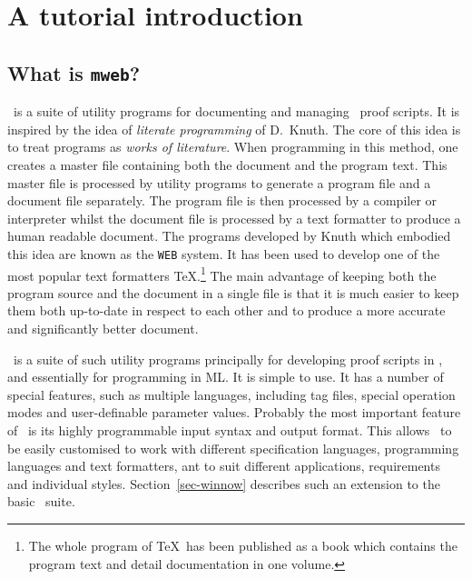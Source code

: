 \section{A tutorial introduction}

\subsection{What is {\tt mweb}?}

\mweb\ is a suite of utility programs for documenting and managing \HOL\ proof
scripts. It is inspired by the idea of {\em literate
programming\/} of D.~Knuth\cite{Knuth:CJ-27-2-97}. The core of this idea
is to treat programs as {\it works of literature\/}. When programming
in this method, one creates a master file containing both the document
and the program text. This master file is processed by utility
programs to generate a program file and a document file separately. The
program file is then processed by a compiler or interpreter whilst the
document file is processed by a text formatter to produce a human
readable document. The programs developed by Knuth which embodied this
idea are known as the {\tt WEB} system. It has been used to develop one
of the most popular text formatters \TeX.\footnote{The whole program of
\TeX\ has been published as a book \cite{Knuth:ct-b} which
contains the program text and detail documentation in one volume.} The
main advantage of keeping both the program 
source and the document in a single file is that it is much easier to
keep them both up-to-date in respect to each other and to produce a more
accurate and significantly better document.

\mweb\ is a suite of such utility programs principally for developing
proof scripts in \HOL, and essentially for programming in ML.  It is
simple to use. It has a number of special features, such as multiple
languages, including tag files, special operation modes and
user-definable parameter values. Probably the most important feature
of \mweb\ is its highly programmable input syntax and output
format. This allows \mweb\ to be easily customised to work with
different specification languages, programming languages and text
formatters, ant to suit different applications, requirements and
individual styles. Section~\ref{sec-winnow} describes such an
extension to the basic \mweb\ suite.

